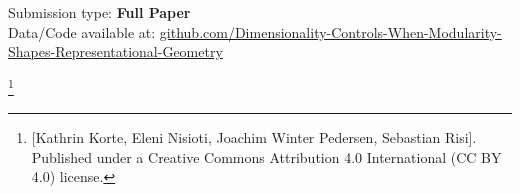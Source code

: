 \documentclass[letterpaper]{article}
\newcommand\blfootnote[1]{%
  \begingroup
  \renewcommand\thefootnote{}\footnote{#1}%
  \addtocounter{footnote}{-1}%
  \endgroup
}
\newif\ifanonymous
\begin{document}
\begin{abstract}
        
        
        






    
        
\end{abstract}


Submission type: \textbf{Full Paper}\\


Data/Code available at: \href{https://github.com/kat-ko/Dimensionality-Controls-When-Modularity-Shapes-Representational-Geometry}{github.com/Dimensionality-Controls-When-Modularity-Shapes-Representational-Geometry}

\ifanonymous\else
\blfootnote{ [Kathrin Korte, Eleni Nisioti, Joachim Winter Pedersen, Sebastian Risi]. Published under a Creative Commons Attribution 4.0 International (CC BY 4.0) license.}
\fi
\end{document}
